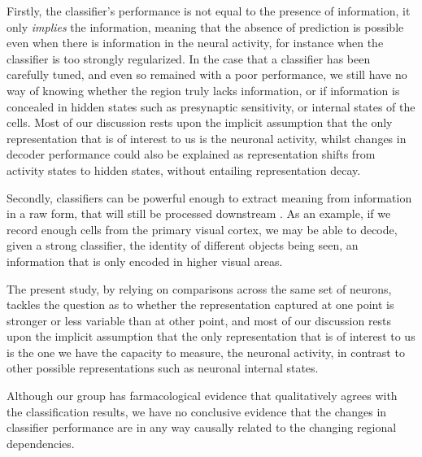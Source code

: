 Firstly, the classifier's performance is not equal to the presence of information, it only \textit{implies} the information, meaning that the absence of prediction is possible even when there is information in the neural activity, for instance when the classifier is too strongly regularized. In the case that a classifier has been carefully tuned, and even so remained with a poor performance, we still have no way of knowing whether the region truly lacks information, or if information is concealed in hidden states such as presynaptic sensitivity, or internal states of the cells. Most of our discussion rests upon the implicit assumption that the only representation that is of interest to us is the neuronal activity, whilst changes in decoder performance could also be explained as representation shifts from activity states to hidden states, without entailing representation decay. 

Secondly, classifiers can be powerful enough to extract meaning from information in a raw form, that will still be processed downstream \cite{king2014characterizing}. As an example, if we record enough cells from the primary visual cortex, we may be able to decode, given a strong classifier, the identity of different objects being seen, an information that is only encoded in higher visual areas. 

The present study, by relying on comparisons across the same set of neurons, tackles the question as to whether the representation captured at one point is stronger or less variable than at other point, and most of our discussion rests upon the implicit assumption that the only representation that is of interest to us is the one we have the capacity to measure, the neuronal activity, in contrast to other possible representations such as neuronal internal states.

Although our group has farmacological evidence that qualitatively agrees with the classification results, we have no conclusive evidence that the changes in classifier performance are in any way causally related to the changing regional dependencies. 



